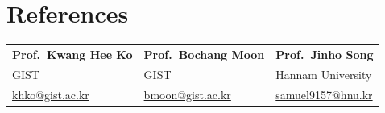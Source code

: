 \documentclass[10pt,a4paper]{article}
\begin{document}
	\section*{References}
	\noindent
	\begin{tabular*}{\textwidth}{@{}p{}p{}p{}@{}}
		\textbf{Prof.\ Kwang Hee Ko} & \textbf{Prof.\ Bochang Moon} & \textbf{Prof.\ Jinho Song} \\
		GIST & GIST & Hannam University \\
		\href{mailto:khko@gist.ac.kr}{khko@gist.ac.kr} &
		\href{mailto:bmoon@gist.ac.kr}{bmoon@gist.ac.kr} &
		\href{mailto:samuel9157@hnu.kr}{samuel9157@hnu.kr} \\
	\end{tabular*}
	
\end{document}
